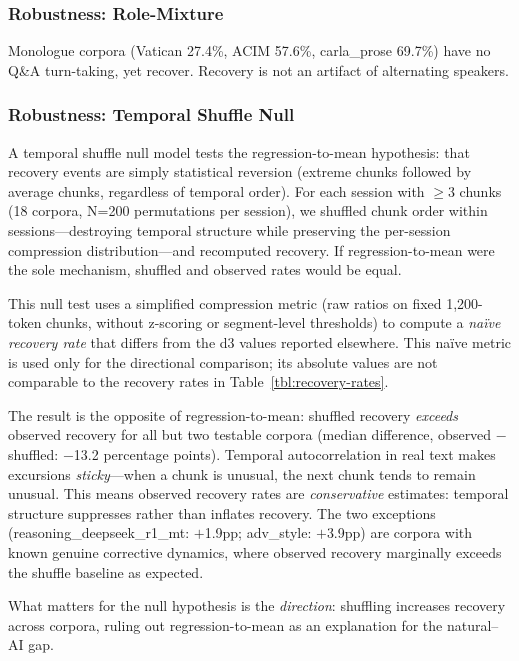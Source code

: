 \documentclass[11pt]{article}
\begin{document}
\subsubsection{Robustness: Role-Mixture}

Monologue corpora (Vatican 27.4\%, ACIM 57.6\%, carla\_prose 69.7\%) have no Q\&A turn-taking, yet recover. Recovery is not an artifact of alternating speakers.

\subsubsection{Robustness: Temporal Shuffle Null}

A temporal shuffle null model tests the regression-to-mean hypothesis: that recovery events are simply statistical reversion (extreme chunks followed by average chunks, regardless of temporal order). For each session with $\geq$3 chunks (18 corpora, N=200 permutations per session), we shuffled chunk order within sessions---destroying temporal structure while preserving the per-session compression distribution---and recomputed recovery. If regression-to-mean were the sole mechanism, shuffled and observed rates would be equal.

This null test uses a simplified compression metric (raw ratios on fixed 1,200-token chunks, without z-scoring or segment-level thresholds) to compute a \textit{na\"ive recovery rate} that differs from the d3 values reported elsewhere. This na\"ive metric is used only for the directional comparison; its absolute values are not comparable to the recovery rates in Table~\ref{tbl:recovery-rates}.

The result is the opposite of regression-to-mean: shuffled recovery \textit{exceeds} observed recovery for all but two testable corpora (median difference, observed $-$ shuffled: $-$13.2 percentage points). Temporal autocorrelation in real text makes excursions \textit{sticky}---when a chunk is unusual, the next chunk tends to remain unusual. This means observed recovery rates are \textit{conservative} estimates: temporal structure suppresses rather than inflates recovery. The two exceptions (reasoning\_deepseek\_r1\_mt: $+$1.9pp; adv\_style: $+$3.9pp) are corpora with known genuine corrective dynamics, where observed recovery marginally exceeds the shuffle baseline as expected.

What matters for the null hypothesis is the \textit{direction}: shuffling increases recovery across corpora, ruling out regression-to-mean as an explanation for the natural--AI gap.
\end{document}
